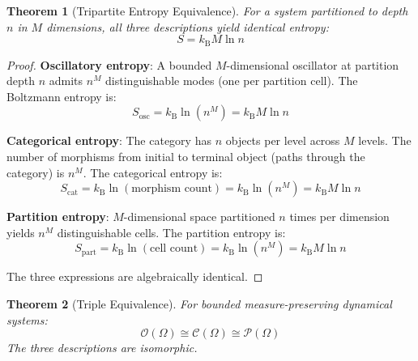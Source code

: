 \documentclass[10pt,twocolumn]{article}
\theoremstyle{plain}
\newtheorem{theorem}{Theorem}[section]
\theoremstyle{definition}
\theoremstyle{remark}
\newcommand{\kB}{k_{\mathrm{B}}}
\newcommand{\Pcat}{\mathcal{P}}
\newcommand{\Ocat}{\mathcal{O}}
\newcommand{\Ccat}{\mathcal{C}}
\begin{document}
\begin{theorem}[Tripartite Entropy Equivalence]
\label{thm:entropy}
For a system partitioned to depth $n$ in $M$ dimensions, all three descriptions yield identical entropy:
\begin{equation}
S = \kB M \ln n
\label{eq:entropy_identity}
\end{equation}
\end{theorem}

\begin{proof}
\textbf{Oscillatory entropy}: A bounded $M$-dimensional oscillator at partition depth $n$ admits $n^M$ distinguishable modes (one per partition cell). The Boltzmann entropy is:
\begin{equation}
S_{\mathrm{osc}} = \kB \ln(n^M) = \kB M \ln n
\end{equation}

\textbf{Categorical entropy}: The category has $n$ objects per level across $M$ levels. The number of morphisms from initial to terminal object (paths through the category) is $n^M$. The categorical entropy is:
\begin{equation}
S_{\mathrm{cat}} = \kB \ln(\text{morphism count}) = \kB \ln(n^M) = \kB M \ln n
\end{equation}

\textbf{Partition entropy}: $M$-dimensional space partitioned $n$ times per dimension yields $n^M$ distinguishable cells. The partition entropy is:
\begin{equation}
S_{\mathrm{part}} = \kB \ln(\text{cell count}) = \kB \ln(n^M) = \kB M \ln n
\end{equation}

The three expressions are algebraically identical.
\end{proof}

\begin{theorem}[Triple Equivalence]
\label{thm:triple}
For bounded measure-preserving dynamical systems:
\begin{equation}
\Ocat(\Omega) \cong \Ccat(\Omega) \cong \Pcat(\Omega)
\label{eq:triple_equiv}
\end{equation}
The three descriptions are isomorphic.
\end{theorem}
\end{document}
